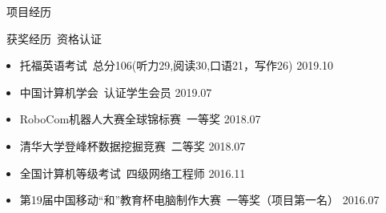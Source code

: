 \documentclass[UTF8]{resume}
\begin{document}
\begin{rSection}{\faUsers~项目经历}
\end{rSection}

\begin{rSection}{\faAward~获奖经历~资格认证}
    \begin{itemize}
        \itemsep -0.5em \vspace{-0.5em}
        \item 托福英语考试~总分106(听力29,阅读30,口语21，写作26) \hfill 2019.10
        \item 中国计算机学会~认证学生会员 \hfill 2019.07
        \item RoboCom机器人大赛全球锦标赛~一等奖 \hfill 2018.07
        \item 清华大学登峰杯数据挖掘竞赛~二等奖 \hfill 2018.07 
        \item 全国计算机等级考试~四级网络工程师 \hfill 2016.11
        \item 第19届中国移动“和”教育杯电脑制作大赛~一等奖（项目第一名） \hfill 2016.07
    \end{itemize}
\end{rSection}
\end{document}

